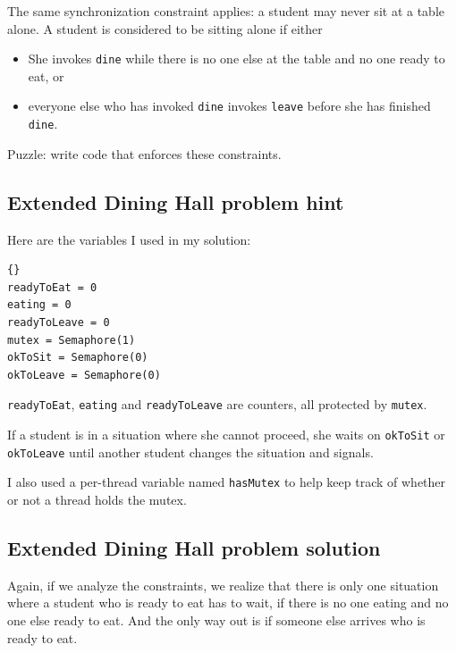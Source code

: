 \documentclass{book}
\newcommand{\clearemptydoublepage}{\newpage\cleardoublepage}
\begin{document}
The same synchronization constraint applies: a student may never sit
at a table alone.  A student is considered to be sitting alone if
either

\begin{itemize}

\item She invokes {\tt dine} while there is no one else at the table
and no one ready to eat, or

\item everyone else who has invoked {\tt dine} invokes {\tt leave}
before she has finished {\tt dine}.

\end{itemize}

Puzzle: write code that enforces these constraints.


\clearemptydoublepage
\subsection {Extended Dining Hall problem hint}

Here are the variables I used in my solution:

\begin{lstlisting}[title={Extended Dining Hall problem hint}]{}
readyToEat = 0
eating = 0
readyToLeave = 0
mutex = Semaphore(1)
okToSit = Semaphore(0)
okToLeave = Semaphore(0)
\end{lstlisting}

{\tt readyToEat}, {\tt eating} and {\tt readyToLeave} are
counters, all protected by {\tt mutex}.

If a student is in a situation where she cannot proceed, she
waits on
{\tt okToSit} or {\tt okToLeave} until another student changes
the situation and signals.

I also used a per-thread variable named {\tt hasMutex} to help
keep track of whether or not a thread holds the mutex.


\clearemptydoublepage
\subsection {Extended Dining Hall problem solution}

Again, if we analyze the constraints, we realize that there is
only one situation where a student who is ready to eat has
to wait, if there is no one eating and no one else ready to
eat.  And the only way out is if someone else arrives who
is ready to eat.
\end{document}
